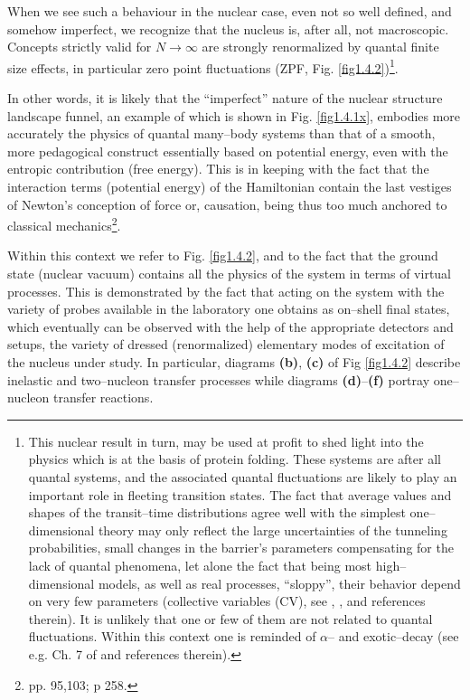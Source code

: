 When we see such a behaviour in the nuclear case, even not so well defined, and somehow imperfect, we recognize that the nucleus is, after all, not macroscopic. Concepts strictly valid for $N\rightarrow\infty$ are strongly renormalized by quantal finite size effects, in particular zero point fluctuations (ZPF, Fig. \ref{fig1.4.2})\footnote{This nuclear result in turn, may be used at profit to shed light into the physics which is at the basis of protein folding. These systems are after all quantal systems, and the associated quantal fluctuations are likely to play an important role in fleeting transition states. The fact that average values and shapes of the transit--time distributions agree well with the simplest one--dimensional theory may only reflect the large uncertainties of the tunneling probabilities, small changes in the barrier's parameters compensating for the lack of quantal phenomena, let alone the fact that being most high--dimensional models, as well as real processes, ``sloppy'', their behavior depend on very few parameters (collective variables (CV), see \cite{Buchanan:15}, \cite{Transtrum:15}, and references therein). It is unlikely that one or few of them are not  related to quantal fluctuations.  Within this context one is reminded of $\alpha$-- and exotic--decay (see e.g. Ch. 7 of \cite{Brink:05} and references therein).}.

In other words, it is likely that the ``imperfect'' nature of the nuclear structure landscape funnel, an example of which is shown in Fig. \ref{fig1.4.1x}, embodies more accurately the physics of quantal many--body systems than that of a smooth, more pedagogical construct essentially based on potential energy, even with the entropic contribution (free energy). This is in keeping with the fact that the interaction terms (potential energy) of the Hamiltonian contain the last vestiges of Newton's conception of force or, causation, being thus too much anchored to classical mechanics\footnote{\cite{Born:48} pp. 95,103; \cite{Pais:86} p 258.}.

Within this context we refer to Fig. \ref{fig1.4.2}, and to the fact that the ground state (nuclear vacuum)  contains   all the physics of the system in terms of virtual processes. This is demonstrated by the fact that acting on  the system with the variety of probes available in the laboratory one obtains as on--shell final states, which eventually can be observed with the help of the appropriate detectors and setups, the variety of dressed (renormalized) elementary modes of excitation of the nucleus under study. In particular, diagrams \textbf{(b)}, \textbf{(c)} of Fig \ref{fig1.4.2} describe inelastic and two--nucleon transfer processes while diagrams  \textbf{(d)}--\textbf{(f)} portray  one--nucleon transfer reactions. 


